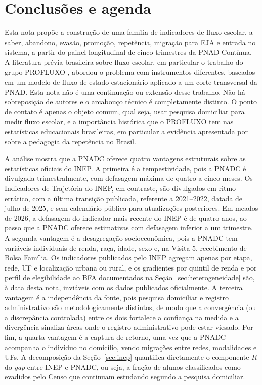 
\section{Conclusões e agenda}
\label{sec:conclusao}

Esta nota propõe a construção de uma família de indicadores de
fluxo escolar, a saber, abandono, evasão, promoção, repetência,
migração para EJA e entrada no sistema, a partir do painel
longitudinal de cinco trimestres da PNAD Contínua. A literatura prévia brasileira sobre
fluxo escolar, em particular o trabalho do grupo PROFLUXO
\citep{Fletcher1985_modelo, Ribeiro1991_pedagogia,
KleinRibeiro1991_censo, Klein2006_educacao}, abordou o problema com
instrumentos diferentes, baseados em um modelo de fluxo de estado
estacionário aplicado a um corte transversal da PNAD. Esta nota não
é uma continuação ou extensão desse trabalho. Não há sobreposição
de autores e o arcabouço técnico é completamente distinto. O ponto
de contato é apenas o objeto comum, qual seja, usar pesquisa
domiciliar para medir fluxo escolar, e a importância histórica que
o PROFLUXO tem nas estatísticas educacionais brasileiras, em
particular a evidência apresentada por \cite{Ribeiro1991_pedagogia}
sobre a pedagogia da repetência no Brasil.

A análise mostra que a PNADC oferece quatro vantagens estruturais
sobre as estatísticas oficiais do INEP. A primeira é a
tempestividade, pois a PNADC é divulgada trimestralmente, com
defasagem máxima de quatro a cinco meses. Os Indicadores de
Trajetória do INEP, em contraste, são divulgados em ritmo errático,
com a última transição publicada, referente a 2021--2022, datada de
julho de 2025, e sem calendário público para atualizações
posteriores. Em meados de 2026, a defasagem do indicador mais
recente do INEP é de quatro anos, ao passo que a PNADC oferece
estimativas com defasagem inferior a um trimestre. A segunda
vantagem é a desagregação socioeconômica, pois a PNADC tem
variáveis individuais de renda, raça, idade, sexo e, na Visita 5,
recebimento de Bolsa Família. Os indicadores publicados pelo INEP
agregam apenas por etapa, rede, UF e localização urbana ou rural,
e os gradientes por quintil de renda e por perfil de elegibilidade
ao BFA documentados na Seção~\ref{sec:heterogeneidade} são, à data
desta nota, inviáveis com os dados publicados oficialmente. A
terceira vantagem é a independência da fonte, pois pesquisa
domiciliar e registro administrativo são metodologicamente
distintos, de modo que a convergência (ou a discrepância
controlada) entre os dois fortalece a confiança na medida e a
divergência sinaliza áreas onde o registro administrativo pode
estar viesado. Por fim, a quarta vantagem é a captura de retorno,
uma vez que a PNADC acompanha o indivíduo no domicílio, vendo
migrações entre redes, modalidades e UFs. A decomposição da
Seção~\ref{sec:inep} quantifica diretamente o componente $R$ do
\emph{gap} entre INEP e PNADC, ou seja, a fração de alunos
classificados como evadidos pelo Censo que continuam estudando
segundo a pesquisa domiciliar.

